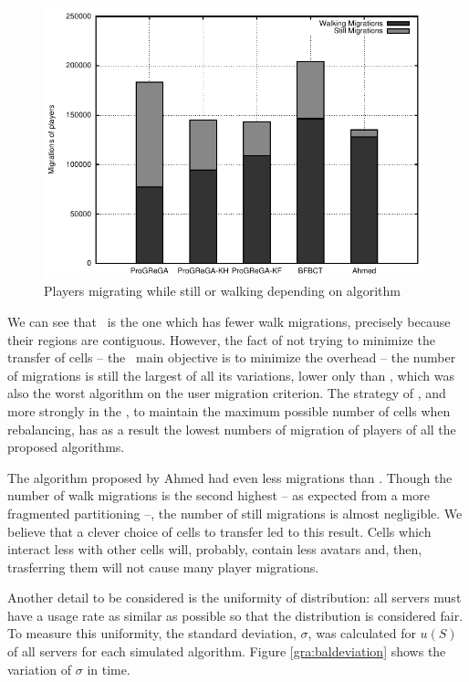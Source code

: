 \begin{figure}[!t]
  \centering
  \includegraphics[width=0.9\linewidth]{images/balmigxtb_ah}
  \caption{Players migrating while still or walking depending on algorithm}
  \label{gra:balmigxtb}
\end{figure}

	
We can see that \ggp\ is the one which has fewer walk migrations, precisely because their regions are contiguous. However, the fact of not trying to minimize the transfer of cells -- the \ggp\ main objective is to minimize the overhead -- the number of migrations is still the largest of all its variations, lower only than \bfa, which was also the worst algorithm on the user migration criterion. The strategy of \ggpk, and more strongly in the \ggpf, to maintain the maximum possible number of cells when rebalancing, has as a result the lowest numbers of migration of players of all the proposed algorithms.

The algorithm proposed by Ahmed had even less migrations than \ggpf. Though the number of walk migrations is the second highest -- as expected from a more fragmented partitioning --, the number of still migrations is almost negligible. We believe that a clever choice of cells to transfer led to this result. Cells which interact less with other cells will, probably, contain less avatars and, then, trasferring them will not cause many player migrations.

Another detail to be considered is the uniformity of distribution: all servers must have a usage rate as similar as possible so that the distribution is considered fair. To measure this uniformity, the standard deviation, $\sigma$, was calculated for $u(S)$ of all servers for each simulated algorithm. Figure \ref{gra:baldeviation} shows the variation of $\sigma$ in time.

